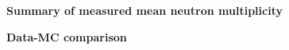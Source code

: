 %
\begin{frame}{\bf \LARGE Summary of measured mean neutron multiplicity}
\begin{table}[H]
\hspace{-0.1in}
{\footnotesize

}
\end{table}
\end{frame}
%

%
\begin{frame}{\bf \LARGE Data-MC comparison}
\begin{table}[H]
\hspace{-0.1in}
{\footnotesize

}
\end{table}
\end{frame}
%
